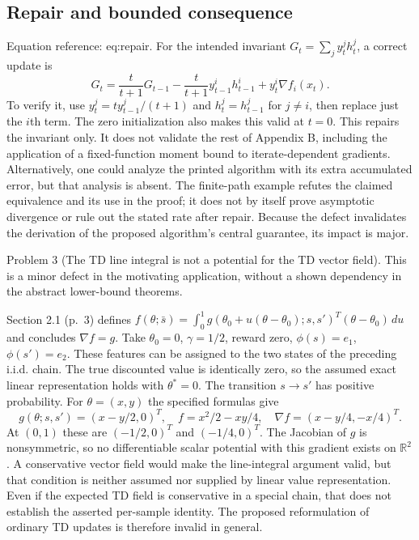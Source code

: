 \documentclass[10pt]{article}
\begin{document}
\subsection*{Repair and bounded consequence}
Equation reference: eq:repair. For the intended invariant \(G_t=\sum_jy_t^jh_t^j\), a correct update is \[
 G_t=\frac{t}{t+1}G_{t-1}
 -\frac{t}{t+1}y_{t-1}^i h_{t-1}^i
 +y_t^i\nabla f_i(x_t).\] To verify it, use \(y_t^j=t y_{t-1}^j/(t+1)\) and \(h_t^j=h_{t-1}^j\) for \(j\ne i\), then replace just the \(i\)th term. The zero initialization also makes this valid at \(t=0\). This repairs the invariant only. It does not validate the rest of Appendix B, including the application of a fixed-function moment bound to iterate-dependent gradients. Alternatively, one could analyze the printed algorithm with its extra accumulated error, but that analysis is absent. The finite-path example refutes the claimed equivalence and its use in the proof; it does not by itself prove asymptotic divergence or rule out the stated rate after repair. Because the defect invalidates the derivation of the proposed algorithm’s central guarantee, its impact is major.\par
Problem 3 (The TD line integral is not a potential for the TD vector field).  This is a minor defect in the motivating application, without a shown dependency in the abstract lower-bound theorems.\par
Section 2.1 (p. 3) defines \(f(\theta;\bar s)=\int_0^1g(\theta_0+u(\theta-\theta_0);s,s')^T
(\theta-\theta_0)\,du\) and concludes \(\nabla f=g\). Take \(\theta_0=0\), \(\gamma=1/2\), reward zero, \(\phi(s)=e_1\), \(\phi(s')=e_2\). These features can be assigned to the two states of the preceding i.i.d. chain. The true discounted value is identically zero, so the assumed exact linear representation holds with \(\theta^*=0\). The transition \(s\to s'\) has positive probability. For \(\theta=(x,y)\) the specified formulas give \[g(\theta;s,s')=(x-y/2,0)^T,\quad
 f=x^2/2-xy/4,\quad
 \nabla f=(x-y/4,-x/4)^T.\] At \((0,1)\) these are \((-1/2,0)^T\) and \((-1/4,0)^T\). The Jacobian of \(g\) is nonsymmetric, so no differentiable scalar potential with this gradient exists on \(\mathbb R^2\). A conservative vector field would make the line-integral argument valid, but that condition is neither assumed nor supplied by linear value representation. Even if the expected TD field is conservative in a special chain, that does not establish the asserted per-sample identity. The proposed reformulation of ordinary TD updates is therefore invalid in general.\par
\end{document}
